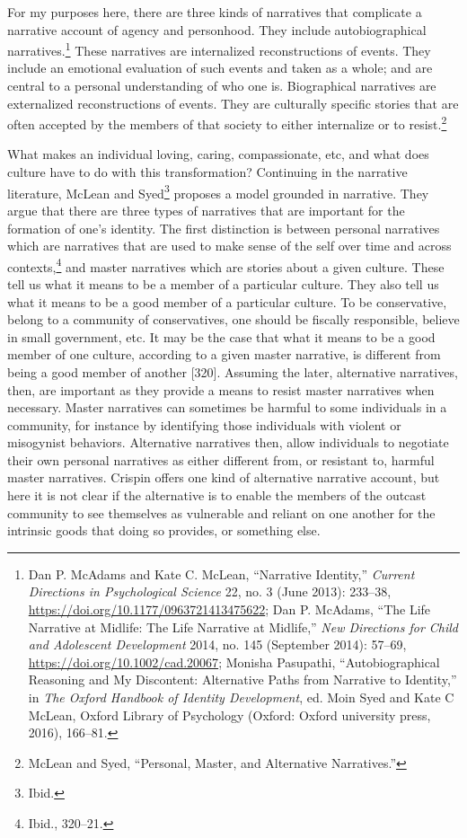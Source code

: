 \documentclass[phdthesis,12pt,final]{wuthesis}
\theoremstyle{definition}
\theoremstyle{definition}
\theoremstyle{definition}
\theoremstyle{definition}
\theoremstyle{remark}
\begin{document}
For my purposes here, there are three kinds of narratives that complicate a narrative account of agency and personhood. They include autobiographical narratives.\footnote{Dan P. McAdams and Kate C. McLean, {``Narrative {Identity},''} \emph{Current Directions in Psychological Science} 22, no. 3 (June 2013): 233--38, \url{https://doi.org/10.1177/0963721413475622}; Dan P. McAdams, {``The {Life Narrative} at {Midlife}: {The Life Narrative} at {Midlife},''} \emph{New Directions for Child and Adolescent Development} 2014, no. 145 (September 2014): 57--69, \url{https://doi.org/10.1002/cad.20067}; Monisha Pasupathi, {``Autobiographical {Reasoning} and {My} {Discontent}: {Alternative Paths} from {Narrative} to {Identity},''} in \emph{The {Oxford} Handbook of Identity Development}, ed. Moin Syed and Kate C McLean, Oxford Library of Psychology (Oxford: Oxford university press, 2016), 166--81.} These narratives are internalized reconstructions of events. They include an emotional evaluation of such events and taken as a whole; and are central to a personal understanding of who one is. Biographical narratives are externalized reconstructions of events. They are culturally specific stories that are often accepted by the members of that society to either internalize or to resist.\footnote{McLean and Syed, {``Personal, {Master}, and {Alternative Narratives}.''}}

What makes an individual loving, caring, compassionate, etc, and what does culture have to do with this transformation? Continuing in the narrative literature, McLean and Syed\footnote{Ibid.} proposes a model grounded in narrative. They argue that there are three types of narratives that are important for the formation of one's identity. The first distinction is between personal narratives which are narratives that are used to make sense of the self over time and across contexts,\footnote{Ibid., 320--21.} and master narratives which are stories about a given culture. These tell us what it means to be a member of a particular culture. They also tell us what it means to be a good member of a particular culture. To be conservative, belong to a community of conservatives, one should be fiscally responsible, believe in small government, etc. It may be the case that what it means to be a good member of one culture, according to a given master narrative, is different from being a good member of another {[}320{]}. Assuming the later, alternative narratives, then, are important as they provide a means to resist master narratives when necessary. Master narratives can sometimes be harmful to some individuals in a community, for instance by identifying those individuals with violent or misogynist behaviors. Alternative narratives then, allow individuals to negotiate their own personal narratives as either different from, or resistant to, harmful master narratives. Crispin offers one kind of alternative narrative account, but here it is not clear if the alternative is to enable the members of the outcast community to see themselves as vulnerable and reliant on one another for the intrinsic goods that doing so provides, or something else.
\end{document}
